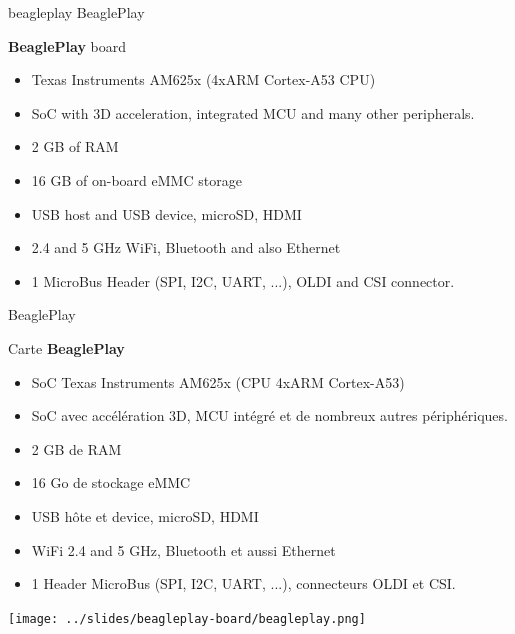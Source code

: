 {beagleplay}
{BeaglePlay}
{
  {\bf BeaglePlay} board
  \vspace{0.5cm}
  \begin{itemize}
    \item Texas Instruments AM625x (4xARM Cortex-A53 CPU)
    \item SoC with 3D acceleration, integrated MCU and many other peripherals.
    \item 2 GB of RAM
    \item 16 GB of on-board eMMC storage
    \item USB host and USB device, microSD, HDMI
    \item 2.4 and 5 GHz WiFi, Bluetooth and also Ethernet
    \item 1 MicroBus Header (SPI, I2C, UART, ...), OLDI and CSI connector.
  \vspace{-0.7cm}
  \end{itemize}
}
{BeaglePlay}
{
  Carte {\bf BeaglePlay}
  \vspace{0.5cm}
  \begin{itemize}
    \item SoC Texas Instruments AM625x (CPU 4xARM Cortex-A53)
    \item SoC avec accélération 3D, MCU intégré et de nombreux autres périphériques.
    \item 2 GB de RAM
    \item 16 Go de stockage eMMC
    \item USB hôte et device, microSD, HDMI
    \item WiFi 2.4 and 5 GHz, Bluetooth et aussi Ethernet
    \item 1 Header MicroBus (SPI, I2C, UART, ...), connecteurs OLDI et CSI.
  \vspace{-0.7cm}
  \end{itemize}
}
{
  \begin{center}
    \texttt{[image: ../slides/beagleplay-board/beagleplay.png]}
  \end{center}
}
